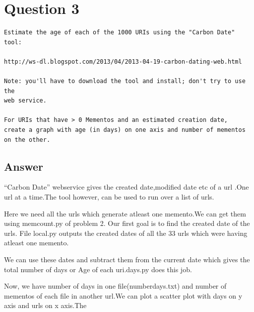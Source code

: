 \documentclass[letterpaper,11pt]{article}
\begin{document}
\newpage
\section{Question 3}
\label{part3}
\begin{verbatim}
Estimate the age of each of the 1000 URIs using the "Carbon Date" tool:

http://ws-dl.blogspot.com/2013/04/2013-04-19-carbon-dating-web.html

Note: you'll have to download the tool and install; don't try to use the 
web service.  

For URIs that have > 0 Mementos and an estimated creation date,
create a graph with age (in days) on one axis and number of mementos
on the other.
\end{verbatim}

\newpage
\subsection{Answer}
``Carbon Date''  webservice gives the created date,modified date etc of a url .One url at a time.The tool however, can be used to run over a list of urls. 

Here we need all the urls which generate atleast one memento.We can get them using memcount.py of problem 2. Our first goal is to find the created date of the urls. File local.py outputs the created dates of all the 33 urls which were having atleast one memento.

We can use these dates and subtract them from the current date which gives the total number of days or Age of each uri.days.py does this job.

Now, we have number of days in one file(numberdays.txt) and number of mementos of each file in another url.We can plot a scatter plot with days on y axis and urls on x axis.The 





\end{document}
